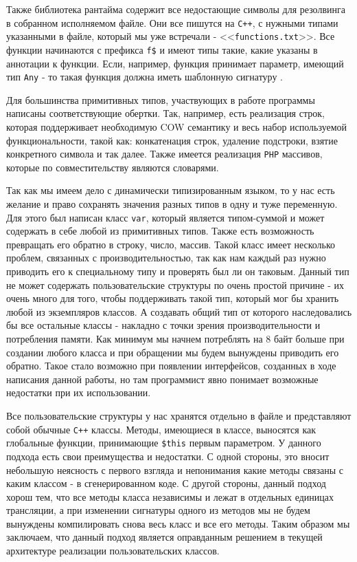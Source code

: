 Также библиотека рантайма содержит все недостающие символы для резолвинга в собранном исполняемом файле.
Они все пишутся на \verb|C++|, с нужными типами указанными в файле, который мы уже встречали - <<\verb|functions.txt|>>.
Все функции начинаются с префикса \verb|f$| и имеют типы такие, какие указаны в аннотации к функции.
Если, например, функция принимает параметр, имеющий тип \verb|Any| - то такая функция должна иметь шаблонную сигнатуру \cite[с.~665]{Stroustrup}.

Для большинства примитивных типов, участвующих в работе программы написаны соответствующие обертки.
Так, например, есть реализация строк, которая поддерживает необходимую COW \cite{COW} семантику и весь набор используемой функциональности, такой как: конкатенация строк, удаление подстроки, взятие конкретного символа и так далее.
Также имеется реализация \verb|PHP| массивов, которые по совместительству являются словарями.

Так как мы имеем дело с динамически типизированным языком, то у нас есть желание и право сохранять значения разных типов в одну и туже переменную.
Для этого был написан класс \verb|var|, который является типом-суммой и может содержать в себе любой из примитивных типов.
Также есть возможность превращать его обратно в строку, число, массив.
Такой класс имеет несколько проблем, связанных с производительностью, так как нам каждый раз нужно приводить его к специальному типу и проверять был ли он таковым.
Данный тип не может содержать пользовательские структуры по очень простой причине - их очень много для того, чтобы поддерживать такой тип, который мог бы хранить любой из экземпляров классов.
А создавать общий тип от которого наследовались бы все остальные классы - накладно с точки зрения производительности и потребления памяти.
Как минимум мы начнем потреблять на 8 байт больше при создании любого класса и при обращении мы будем вынуждены приводить его обратно.
Такое стало возможно при появлении интерфейсов, созданных в ходе написания данной работы, но там программист явно понимает возможные недостатки при их использовании.

Все пользовательские структуры у нас хранятся отдельно в файле и представляют собой обычные \verb|C++| классы.
Методы, имеющиеся в классе, выносятся как глобальные функции, принимающие \verb|$this| первым параметром.
У данного подхода есть свои преимущества и недостатки.
С одной стороны, это вносит небольшую неясность с первого взгляда и непонимания какие методы связаны с каким классом - в сгенерированном коде.
С другой стороны, данный подход хорош тем, что все методы класса независимы и лежат в отдельных единицах трансляции, а при изменении сигнатуры одного из методов мы не будем вынуждены компилировать снова весь класс и все его методы.
Таким образом мы заключаем, что данный подход является оправданным решением в текущей архитектуре реализации пользовательских классов.

